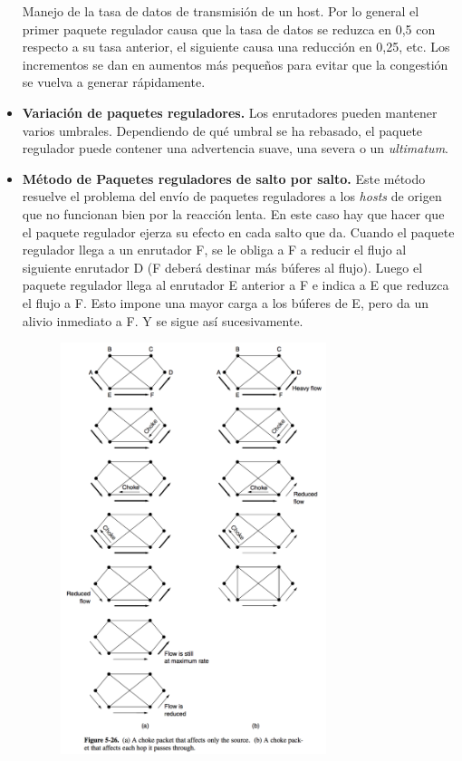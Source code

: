 \documentclass[10pt,a4paper]{report}
\begin{document}
\begin{itemize}
			\par Manejo de la tasa de datos de transmisión de un host. Por lo general el primer paquete regulador causa que la tasa de datos se reduzca en 0,5 con respecto a su tasa anterior, el siguiente causa una reducción en 0,25, etc. Los incrementos se dan en aumentos más pequeños para evitar que la congestión se vuelva a generar rápidamente.

			\item \textbf{Variación de paquetes reguladores.} Los enrutadores pueden mantener varios umbrales. Dependiendo de qué umbral se ha rebasado, el paquete regulador puede contener una advertencia suave, una severa o un \textit{ultimatum}.
			
			\item \textbf{Método de Paquetes reguladores de salto por salto.} Este método resuelve el problema del envío de paquetes reguladores a los \textit{hosts} de origen que no funcionan bien por la reacción lenta. En este caso hay que hacer que el paquete regulador ejerza su efecto en cada salto que da. Cuando el paquete regulador llega a un enrutador F, se le obliga a F a reducir el flujo al siguiente enrutador D (F deberá destinar más búferes al flujo). Luego el paquete regulador llega al enrutador E anterior a F e indica a E que reduzca el flujo a F. Esto impone una mayor carga a los búferes de E, pero da un alivio inmediato a F. Y se sigue así sucesivamente.
			
			\begin{center}
				\includegraphics[width=10cm, height=12cm]{./imagenes/salto.png} 
			\end{center}
	
		\end{itemize}
\end{document}
